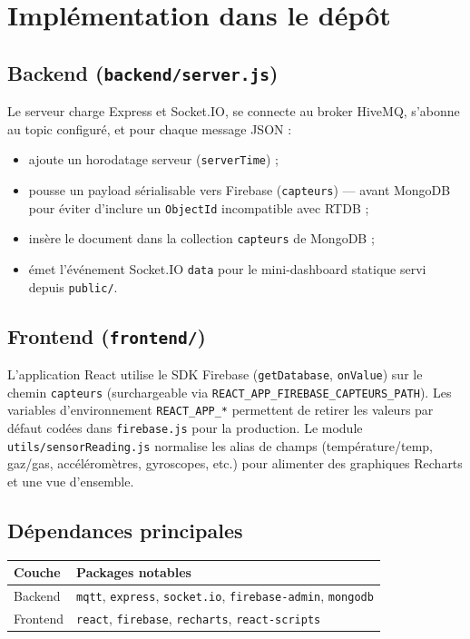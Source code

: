 \documentclass[11pt,a4paper]{article}
\begin{document}
\section{Implémentation dans le dépôt}

\subsection{Backend (\texttt{backend/server.js})}

Le serveur charge Express et Socket.IO, se connecte au broker HiveMQ, s'abonne au topic configuré, et pour chaque message JSON :
\begin{itemize}[leftmargin=*]
  \item ajoute un horodatage serveur (\texttt{serverTime}) ;
  \item pousse un payload sérialisable vers Firebase (\texttt{capteurs}) — avant MongoDB pour éviter d'inclure un \texttt{ObjectId} incompatible avec RTDB ;
  \item insère le document dans la collection \texttt{capteurs} de MongoDB ;
  \item émet l'événement Socket.IO \texttt{data} pour le mini-dashboard statique servi depuis \texttt{public/}.
\end{itemize}

\subsection{Frontend (\texttt{frontend/})}

L'application React utilise le SDK Firebase (\texttt{getDatabase}, \texttt{onValue}) sur le chemin \texttt{capteurs} (surchargeable via \texttt{REACT\_APP\_FIREBASE\_CAPTEURS\_PATH}). Les variables d'environnement \texttt{REACT\_APP\_*} permettent de retirer les valeurs par défaut codées dans \texttt{firebase.js} pour la production. Le module \texttt{utils/sensorReading.js} normalise les alias de champs (température/temp, gaz/gas, accéléromètres, gyroscopes, etc.) pour alimenter des graphiques Recharts et une vue d'ensemble.

\subsection{Dépendances principales}

\begin{center}
\begin{tabular}{@{}ll@{}}
\toprule
\textbf{Couche} & \textbf{Packages notables} \\
\midrule
Backend & \texttt{mqtt}, \texttt{express}, \texttt{socket.io}, \texttt{firebase-admin}, \texttt{mongodb} \\
Frontend & \texttt{react}, \texttt{firebase}, \texttt{recharts}, \texttt{react-scripts} \\
\bottomrule
\end{tabular}
\end{center}
\end{document}
